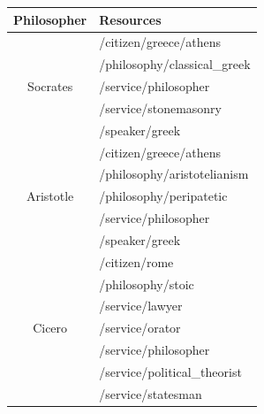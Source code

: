 \begin{table}
        \begin{center}
                \begin{tabular}{| c | l |}
                        \hline
                          Philosopher & Resources \\
                        \hline
                        \hline
                          \multirow{5}{*}{Socrates}              & /citizen/greece/athens \\
                                                                 & /philosophy/classical\_greek \\
                                                                 & /service/philosopher \\
                                                                 & /service/stonemasonry \\
                                                                 & /speaker/greek \\
                        \hline
                          \multirow{5}{*}{Aristotle}             & /citizen/greece/athens \\
                                                                 & /philosophy/aristotelianism \\
                                                                 & /philosophy/peripatetic \\
                                                                 & /service/philosopher \\
                                                                 & /speaker/greek \\
                        \hline
                          \multirow{9}{*}{Cicero}                & /citizen/rome \\
                                                                 & /philosophy/stoic \\
                                                                 & /service/lawyer \\
                                                                 & /service/orator \\
                                                                 & /service/philosopher \\
                                                                 & /service/political\_theorist \\
                                                                 & /service/statesman \\

\end{tabular}
\end{center}
\end{table}
